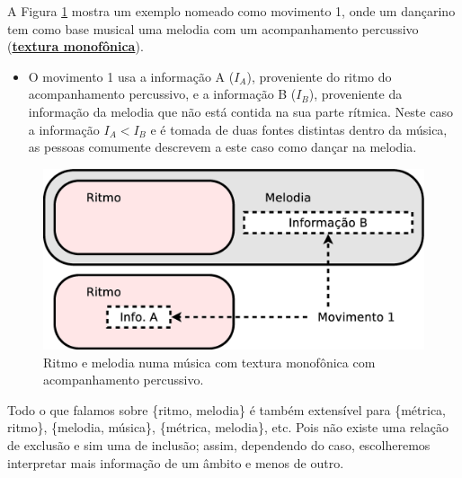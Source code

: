 \begin{example}
\label{ex:ritmovsmelodia2}
A Figura \ref{fig:ritmo-melodia-2} mostra um exemplo nomeado como movimento 1,
onde um dançarino tem como base musical uma melodia com um acompanhamento percussivo 
(\hyperref[subsec:monofonica]{\textbf{textura monofônica}}).
\begin{itemize}
\item O movimento 1 usa a informação A ($I_{A}$), proveniente do ritmo do acompanhamento percussivo,
e a informação B ($I_{B}$), proveniente da informação da melodia que não está contida na sua parte rítmica.
Neste caso a informação $I_A < I_B$ e é tomada de duas fontes distintas dentro da música, 
 as pessoas comumente descrevem a este caso como dançar na melodia. 
\end{itemize}
\end{example}
\begin{figure}[h!]
\centering
      \includegraphics[width=.6\linewidth]{chapters/cap-musicalidade-tecnica/ritmo-melodia-2}  
      \caption{Ritmo e melodia numa música com textura monofônica com acompanhamento percussivo.}
      \label{fig:ritmo-melodia-2}
\end{figure}



Todo o que falamos sobre  \{ritmo, melodia\} é também extensível para 
\{métrica, ritmo\}, \{melodia, música\}, \{métrica, melodia\}, etc.
Pois não existe uma relação de exclusão e sim uma de inclusão;
assim, dependendo do caso, 
escolheremos interpretar mais informação de um âmbito e menos de outro.





